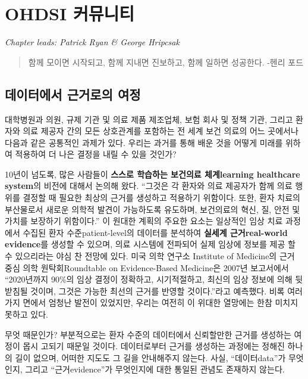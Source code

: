 \documentclass[11pt]{book}
\theoremstyle{definition}
\theoremstyle{definition}
\theoremstyle{definition}
\theoremstyle{remark}
\begin{document}
\chapter{OHDSI 커뮤니티}\label{OhdsiCommunity}

\emph{Chapter leads: Patrick Ryan \& George Hripcsak}

\begin{quote}
함께 모이면 시작되고, 함께 지내면 진보하고, 함께 일하면 성공한다. -헨리
포드
\end{quote}

\section{데이터에서 근거로의 여정}\label{--}

대학병원과 의원, 규제 기관 및 의료 제품 제조업체, 보험 회사 및 정책
기관, 그리고 환자와 의료 제공자 간의 모든 상호관계를 포함하는 전 세계
보건 의료의 어느 곳에서나 다음과 같은 공통적인 과제가 있다. 우리는
과거를 통해 배운 것을 어떻게 미래를 위하여 적용하여 더 나은 결정을 내릴
수 있을 것인가?

10년이 넘도록, 많은 사람들이 \textbf{스스로 학습하는 보건의료
체계learning healthcare system}의 비전에 대해서 논의해 왔다. ``그것은 각
환자와 의료 제공자가 함께 의료 행위를 결정할 때 필요한 최상의 근거를
생성하고 적용하기 위함이다. 또한, 환자 치료의 부산물로서 새로운 의학적
발견이 가능하도록 유도하며, 보건의료의 혁신, 질, 안전 및 가치를 보장하기
위함이다.'' \citep{olsen2007learning} 이 원대한 계획의 주요한 요소는
일상적인 임상 치료 과정에서 수집된 환자 수준patient-level의 데이터를
분석하여 \textbf{실세계 근거real-world evidence}를 생성할 수 있으며,
의료 시스템에 전파되어 실제 임상에 정보를 제공 할 수 있으리라는 야심 찬
전망에 있다. 미국 의학 연구소 Institute of Medicine의 근거 중심 의학
원탁회Roundtable on Evidence-Based Medicine은 2007년 보고서에서
``2020년까지 90\%의 임상 결정이 정확하고, 시기적절하고, 최신의 임상
정보에 의해 뒷받침될 것이며, 그것은 가능한 최선의 근거를 반영할
것이다.''라고 예측했다. \citep{olsen2007learning} 비록 여러 가지 면에서
엄청난 발전이 있었지만, 우리는 여전히 이 위대한 열망에는 한참 미치지
못하고 있다.

무엇 때문인가? 부분적으로는 환자 수준의 데이터에서 신뢰할만한 근거를
생성하는 여정이 몹시 고되기 때문일 것이다. 데이터로부터 근거를 생성하는
과정에는 정해진 하나의 길이 없으며, 어떠한 지도도 그 길을 안내해주지
않는다. 사실, ``데이터data''가 무엇인지, 그리고 ``근거evidence''가
무엇인지에 대한 통일된 관념도 존재하지 않는다.
\end{document}
